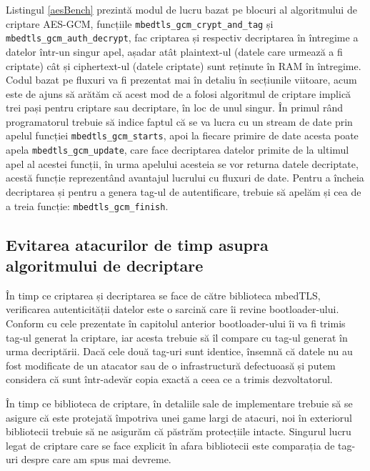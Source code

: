 \documentclass[12pt,a4paper,titlepage]{report}
\begin{document}
Listingul \ref{aesBench} prezintă modul de lucru bazat pe blocuri al algoritmului de criptare AES-GCM, funcțiile \texttt{mbedtls\_gcm\_crypt\_and\_tag} și \texttt{mbedtls\_gcm\_auth\_decrypt}, fac criptarea și respectiv decriptarea în întregime a datelor într-un singur apel, așadar atât plaintext-ul (datele care urmează a fi criptate) cât și ciphertext-ul (datele criptate) sunt reținute în RAM în întregime. Codul bazat pe fluxuri va fi prezentat mai în detaliu în secțiunile viitoare, acum este de ajuns să arătăm că acest mod de a folosi algoritmul de criptare implică trei pași pentru criptare sau decriptare, în loc de unul singur. În primul rând programatorul trebuie să indice faptul că se va lucra cu un stream de date prin apelul funcției \texttt{mbedtls\_gcm\_starts}, apoi la fiecare primire de date acesta poate apela \texttt{mbedtls\_gcm\_update}, care face decriptarea datelor primite de la ultimul apel al acestei funcții, în urma apelului acesteia se vor returna datele decriptate, acestă funcție reprezentând avantajul lucrului cu fluxuri de date. Pentru a încheia decriptarea și pentru a genera tag-ul de autentificare, trebuie să apelăm și cea de a treia funcție: \texttt{mbedtls\_gcm\_finish}.


\subsection{Evitarea atacurilor de timp asupra algoritmului de decriptare}
În timp ce criptarea și decriptarea se face de către biblioteca mbedTLS, verificarea autenticității datelor este o sarcină care îi revine bootloader-ului. Conform cu cele prezentate în capitolul anterior bootloader-ului îi va fi trimis tag-ul generat la criptare, iar acesta trebuie să îl compare cu tag-ul generat în urma decriptării. Dacă cele două tag-uri sunt identice, însemnă că datele nu au fost modificate de un atacator sau de o infrastructură defectuoasă și putem considera că sunt într-adevăr copia exactă a ceea ce a trimis dezvoltatorul.

În timp ce biblioteca de criptare, în detaliile sale de implementare trebuie să se asigure că este protejată împotriva unei game largi de atacuri, noi în exteriorul bibliotecii trebuie să ne asigurăm că păstrăm protecțiile intacte. Singurul lucru legat de criptare care se face explicit în afara bibliotecii este comparația de tag-uri despre care am spus mai devreme.
\end{document}
